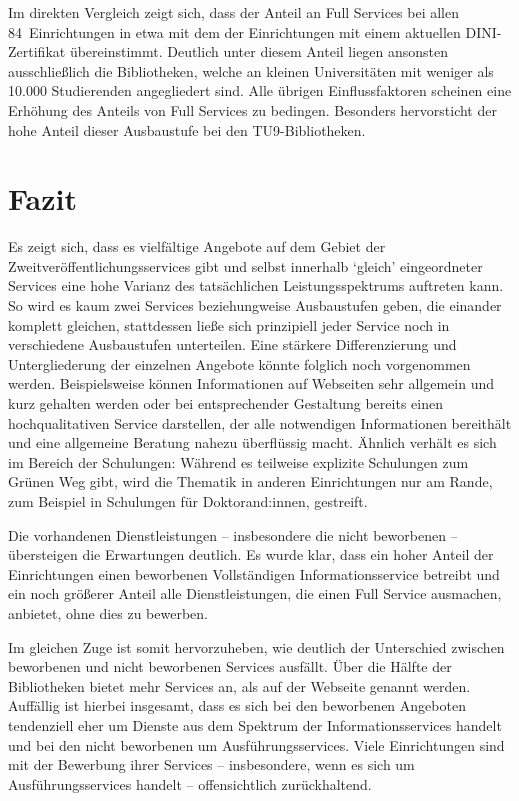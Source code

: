 \documentclass[a4paper,
fontsize=11pt,
oneside,
numbers=noperiodatend,
parskip=half-,
bibliography=totoc,
final
]{scrartcl}
\begin{document}
Im direkten Vergleich zeigt sich, dass der Anteil an Full Services bei
allen 84~Einrichtungen in etwa mit dem der Einrichtungen mit einem
aktuellen DINI-Zertifikat übereinstimmt. Deutlich unter diesem Anteil
liegen ansonsten ausschließlich die Bibliotheken, welche an kleinen
Universitäten mit weniger als 10.000 Studierenden angegliedert sind.
Alle übrigen Einflussfaktoren scheinen eine Erhöhung des Anteils von
Full Services zu bedingen. Besonders hervorsticht der hohe Anteil dieser
Ausbaustufe bei den TU9-Bibliotheken.

\pagebreak 

\hypertarget{fazit}{%
\section{Fazit}\label{fazit}}

Es zeigt sich, dass es vielfältige Angebote auf dem Gebiet der
Zweitveröffentlichungsservices gibt und selbst innerhalb \enquote*{gleich}
eingeordneter Services eine hohe Varianz des tatsächlichen
Leistungsspektrums auftreten kann. So wird es kaum zwei Services
beziehungweise Ausbaustufen geben, die einander komplett gleichen,
stattdessen ließe sich prinzipiell jeder Service noch in verschiedene
Ausbaustufen unterteilen. Eine stärkere Differenzierung und
Untergliederung der einzelnen Angebote könnte folglich noch vorgenommen
werden. Beispielsweise können Informationen auf Webseiten sehr allgemein
und kurz gehalten werden oder bei entsprechender Gestaltung bereits
einen hochqualitativen Service darstellen, der alle notwendigen
Informationen bereithält und eine allgemeine Beratung nahezu überflüssig
macht. Ähnlich verhält es sich im Bereich der Schulungen: Während es
teilweise explizite Schulungen zum Grünen Weg gibt, wird die Thematik in
anderen Einrichtungen nur am Rande, zum Beispiel in Schulungen für
Doktorand:innen, gestreift.

Die vorhandenen Dienstleistungen -- insbesondere die nicht beworbenen --
übersteigen die Erwartungen deutlich. Es wurde klar, dass ein hoher
Anteil der Einrichtungen einen beworbenen Vollständigen
Informationsservice betreibt und ein noch größerer Anteil alle
Dienstleistungen, die einen Full Service ausmachen, anbietet, ohne dies
zu bewerben.

Im gleichen Zuge ist somit hervorzuheben, wie deutlich der Unterschied
zwischen beworbenen und nicht beworbenen Services ausfällt. Über die
Hälfte der Bibliotheken bietet mehr Services an, als auf der Webseite
genannt werden. Auffällig ist hierbei insgesamt, dass es sich bei den
beworbenen Angeboten tendenziell eher um Dienste aus dem Spektrum der
Informationsservices handelt und bei den nicht beworbenen um
Ausführungsservices. Viele Einrichtungen sind mit der Bewerbung ihrer
Services -- insbesondere, wenn es sich um Ausführungsservices handelt --
offensichtlich zurückhaltend.
\end{document}
